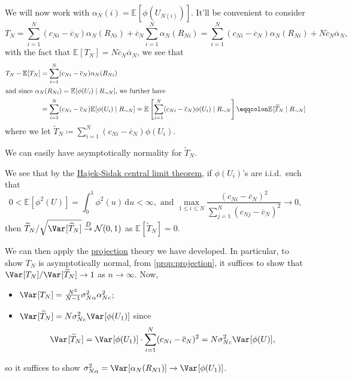 We will now work with \(\alpha _N(i) = \mathbb{E}_{}[\phi (U_{N(i)})] \). It'll be convenient to consider
\[
	T_N
	= \sum_{i=1}^{N} (c_{Ni} - \overline{c} _N) \alpha _N(R_{Ni}) + \overline{c} _N \sum_{i=1}^{N} \alpha _N(R_{Ni})
	= \sum_{i=1}^{N} (c_{Ni} - \overline{c} _N) \alpha _N(R_{Ni}) + N \overline{c} _N \overline{\alpha} _N,
\]
with the fact that \(\mathbb{E}_{}[T_N] = N \overline{c} _N \overline{\alpha} _N\), we see that
\begin{align*}
	T_N - \mathbb{E}_{}[T_N]
	 & = \sum_{i=1}^{N} (c_{Ni} - \overline{c} _N) \alpha _N(R_{Ni})                         \\
	\shortintertext{and since \(\alpha _N(R_{Ni}) = \mathbb{E}_{}[\phi (U_i) \mid R_{\sim N}]\), we further have}
	 & = \sum_{i=1}^{N} (c_{Ni} - \overline{c} _N) \mathbb{E}_{}[\phi (U_i) \mid R_{\sim N}]
	= \mathbb{E}_{}\left[\sum_{i=1}^{N} (c_{Ni} - \overline{c} _N) \phi (U_i) \mid R_{\sim N}\right]
	\eqqcolon \mathbb{E}_{}[\widetilde{T} _N \mid R_{\sim N}]
\end{align*}
where we let \(\widetilde{T} _N \coloneqq \sum_{i=1}^{N} (c_{Ni} - \overline{c} _N) \phi (U_i)\).

\begin{remark}
	We can easily have asymptotically normality for \(\widetilde{T} _N\).
\end{remark}
\begin{explanation}
	We see that by the \hyperref[thm:Hajek-Sidak-CLT]{Hajek-Sidak central limit theorem}, if \(\phi (U_i)\)'s are i.i.d.\ such that
	\[
		0 < \mathbb{E}_{}[\phi ^2(U)] = \int_{0}^{1} \phi ^2(u) \,\mathrm{d}u < \infty, \text{ and }
		\max _{1 \leq i \leq N} \frac{(c_{Ni} - \overline{c} _N)^2}{\sum_{j=1}^{N} (c_{Nj} - \overline{c} _N)^2} \to 0,
	\]
	then \(\widetilde{T} _N / \sqrt{\Var_{}[\widetilde{T} _N] } \overset{D}{\to} \mathcal{N} (0, 1)\) as \(\mathbb{E}_{}[\widetilde{T} _N] = 0 \).
\end{explanation}

We can then apply the \hyperref[def:projection]{projection} theory we have developed. In particular, to show \(T_N\) is asymptotically normal, from \autoref{prop:projection}, it suffices to show that \(\Var_{}[T_N] / \Var_{}[\widetilde{T} _N] \to 1\) as \(n \to \infty \). Now,
\begin{itemize}
	\item \(\Var_{}[T_N] = \frac{N^2}{N-1} \sigma _{N \alpha }^2 \alpha _{Nc}^2\);
	\item \(\Var_{}[\widetilde{T} _N] = N \sigma _{Nc}^2 \Var_{}[\phi (U_1)] \) since
	      \[
		      \Var_{}[\widetilde{T} _N]
		      = \Var_{}[\phi (U_1)] \cdot \sum_{i=1}^{N} (c_{Ni} - \overline{c} _N)^2
		      = N \sigma _{Nc}^2 \Var_{}[\phi (U)] ,
	      \]
\end{itemize}
so it suffices to show \(\sigma _{N \alpha }^2 = \Var_{}[\alpha _N(R_{N1})] \to \Var_{}[\phi (U_1)] \).

